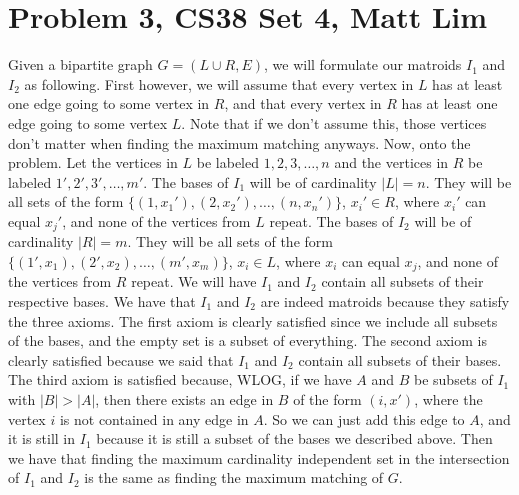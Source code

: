 \documentclass{article}
\begin{document}
\section*{Problem 3, CS38 Set 4, Matt Lim}
Given a bipartite graph $G = (L \cup R, E)$, we will formulate our matroids
$I_1$ and $I_2$ as following. First however, we will assume that every
vertex in $L$ has at least one edge going to some vertex in $R$, and that every
vertex in $R$ has at least one edge going to some vertex $L$. Note that if
we don't assume this, those vertices don't matter when finding the maximum
matching anyways. Now, onto the problem. Let the vertices in $L$ be labeled $1, 2, 3,
\dots, n$ and the vertices in $R$ be labeled $1', 2', 3', \dots, m'$.  The bases
of $I_1$ will be of cardinality $|L| = n$.
They will be all sets of the form $\{(1,x_1'), (2,x_2'), \dots, (n,x_n')\}$,
$x_i' \in R$,
where $x_i'$ can equal $x_j'$, and none of the vertices from $L$ repeat.
The bases of $I_2$ will be of cardinality $|R| =
m$. They will be all sets of the form $\{(1',x_1), (2',x_2), \dots,
(m',x_m)\}$, $x_i \in L$, where $x_i$ can equal $x_j$, and none of the vertices
from $R$ repeat. We will have $I_1$ and
$I_2$ contain all subsets of their respective bases. We have that $I_1$ and
$I_2$ are indeed matroids because they satisfy the three axioms. The first axiom
is clearly satisfied since we include all subsets of the bases, and the empty
set is a subset of everything. The second axiom is clearly satisfied because we
said that $I_1$ and $I_2$ contain all subsets of their bases. The third axiom is
satisfied because, WLOG, if we have $A$ and $B$ be subsets of $I_1$ with $|B| >
|A|$, then there exists an edge in $B$ of the form $(i,x')$, where the vertex
$i$ is not contained in any edge in $A$. So we can just add this edge to $A$,
and it is still in $I_1$ because it is still a subset of the bases we described
above.
Then we have that finding
the maximum cardinality independent set in the intersection of $I_1$ and $I_2$
is the same as finding the maximum matching of $G$.
\end{document}
